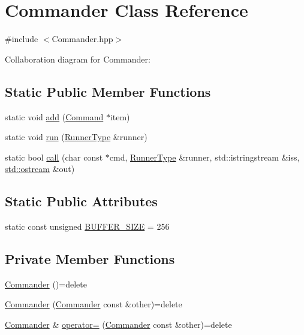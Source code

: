 \hypertarget{classCommander}{}\section{Commander Class Reference}
\label{classCommander}


{\ttfamily \#include $<$Commander.\+hpp$>$}



Collaboration diagram for Commander\+:
\subsection*{Static Public Member Functions}
\begin{DoxyCompactItemize}
\item 
static void \hyperlink{classCommander_a467f6a4ceeb5dab750cf3f4821b5db90}{add} (\hyperlink{classCommand}{Command} $\ast$item)
\item 
static void \hyperlink{classCommander_afea1bfe2bc8dbeea0d0523f369c9539e}{run} (\hyperlink{Command_8hpp_ad45c3de597c2023a8be0399d914161f4}{Runner\+Type} \&runner)
\item 
static bool \hyperlink{classCommander_a28323e9560f01aba51869d54832ca987}{call} (char const $\ast$cmd, \hyperlink{Command_8hpp_ad45c3de597c2023a8be0399d914161f4}{Runner\+Type} \&runner, std\+::istringstream \&iss, \hyperlink{doctest_8h_a116af65cb5e924b33ad9d9ecd7a783f3}{std\+::ostream} \&out)
\end{DoxyCompactItemize}
\subsection*{Static Public Attributes}
\begin{DoxyCompactItemize}
\item 
static const unsigned \hyperlink{classCommander_a9e1b32d844b2d8080e51c4e8a4ca0442}{B\+U\+F\+F\+E\+R\+\_\+\+S\+I\+ZE} = 256
\end{DoxyCompactItemize}
\subsection*{Private Member Functions}
\begin{DoxyCompactItemize}
\item 
\hyperlink{classCommander_accd2048a7f1b8aa3a2b362493d546495}{Commander} ()=delete
\item 
\hyperlink{classCommander_aaf951ebc1b2909dbdccfb3ab7bd80b0d}{Commander} (\hyperlink{classCommander}{Commander} const \&other)=delete
\item 
\hyperlink{classCommander}{Commander} \& \hyperlink{classCommander_a505015f2c954a48742acec695d1559dc}{operator=} (\hyperlink{classCommander}{Commander} const \&other)=delete
\end{DoxyCompactItemize}
